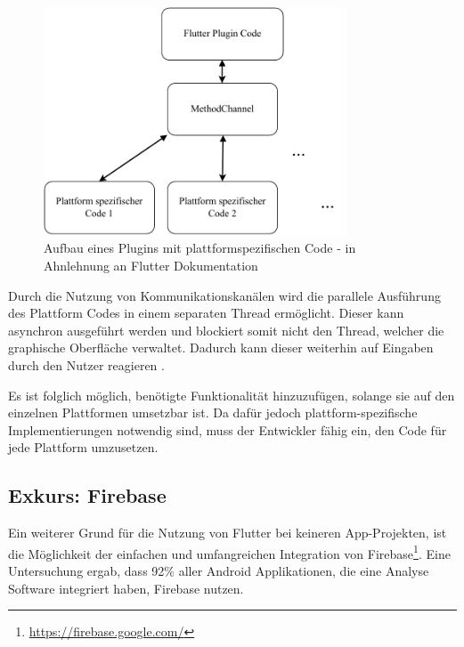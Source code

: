 \begin{figure}[ht]
  \centering
  \includegraphics[width=9cm,keepaspectratio]{images/flutter_plattform_specific.pdf} 
  \caption[Aufbau eines Plugins mit plattformspezifischen Code]{Aufbau eines Plugins mit plattformspezifischen Code - in Ahnlehnung an Flutter Dokumentation\protect\footnotemark}
  \label{fig:flutter_plattform_specific}
\end{figure}


Durch die Nutzung von Kommunikationskanälen wird die parallele Ausführung des Plattform Codes in einem separaten Thread ermöglicht. Dieser kann asynchron ausgeführt werden und blockiert somit nicht den Thread, welcher die graphische Oberfläche verwaltet. Dadurch kann dieser weiterhin auf Eingaben durch den Nutzer reagieren \cite{plattform_code_flutter}.

Es ist folglich möglich, benötigte Funktionalität hinzuzufügen, solange sie auf den einzelnen Plattformen umsetzbar ist. Da dafür jedoch plattform-spezifische Implementierungen notwendig sind, muss der Entwickler fähig ein, den Code für jede Plattform umzusetzen.

\subsection{Exkurs: Firebase}
Ein weiterer Grund für die Nutzung von Flutter bei keineren App-Projekten, ist die Möglichkeit der einfachen und umfangreichen Integration von Firebase\footnote{\url{https://firebase.google.com/}}. Eine Untersuchung \cite{statist_analytics_SDK} ergab, dass 92\% aller Android Applikationen, die eine Analyse Software integriert haben, Firebase nutzen.

